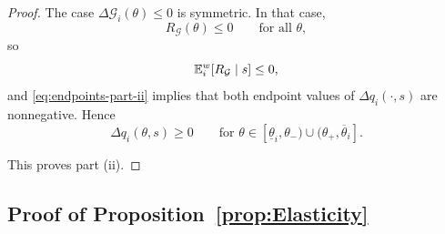 \documentclass[master.tex]{subfiles}
\begin{document}
\begin{proof}
The case $\Delta\mathcal G_i(\theta)\le 0$ is symmetric. In that case,
\[
R_{\mathcal G}(\theta)\le 0
\qquad\text{for all }\theta,
\]
so
\[
\mathbb{E}_i^w[R_{\mathcal G}\mid s]\le 0,
\]
and \eqref{eq:endpoints-part-ii} implies that both endpoint values of $\Delta q_i(\cdot,s)$ are nonnegative. Hence
\[
\Delta q_i(\theta,s)\ge 0
\qquad
\text{for }\theta\in[\underline\theta_i,\theta_-)\cup(\theta_+,\overline\theta_i].
\]

This proves part (ii).
\end{proof}

\subsection{Proof of Proposition~\ref{prop:Elasticity}}
\end{document}
